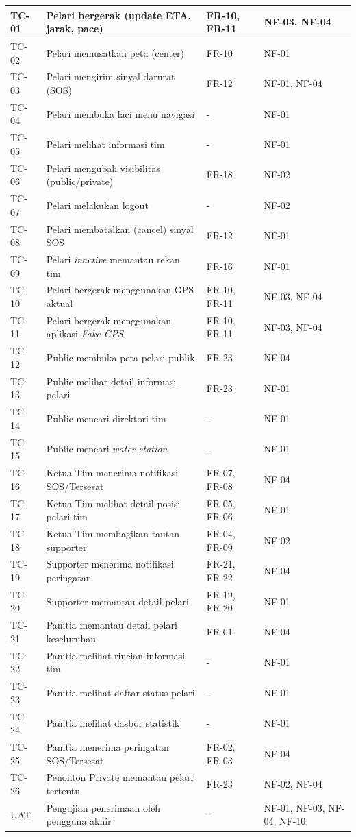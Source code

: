 \begin{longtable}{|p{1.5cm}|p{6cm}|p{2.5cm}|p{2.5cm}|}
TC-01 & Pelari bergerak (update ETA, jarak, pace) & FR-10, FR-11 & NF-03, NF-04 \\ \hline
TC-02 & Pelari memusatkan peta (center) & FR-10 & NF-01 \\ \hline
TC-03 & Pelari mengirim sinyal darurat (SOS) & FR-12 & NF-01, NF-04 \\ \hline
TC-04 & Pelari membuka laci menu navigasi & - & NF-01 \\ \hline
TC-05 & Pelari melihat informasi tim & - & NF-01 \\ \hline
TC-06 & Pelari mengubah visibilitas (public/private) & FR-18 & NF-02 \\ \hline
TC-07 & Pelari melakukan logout & - & NF-02 \\ \hline
TC-08 & Pelari membatalkan (cancel) sinyal SOS & FR-12 & NF-01 \\ \hline
TC-09 & Pelari \textit{inactive} memantau rekan tim & FR-16 & NF-01 \\ \hline
TC-10 & Pelari bergerak menggunakan GPS aktual & FR-10, FR-11 & NF-03, NF-04 \\ \hline
TC-11 & Pelari bergerak menggunakan aplikasi \textit{Fake GPS} & FR-10, FR-11 & NF-03, NF-04 \\ \hline
TC-12 & Public membuka peta pelari publik & FR-23 & NF-04 \\ \hline
TC-13 & Public melihat detail informasi pelari & FR-23 & NF-01 \\ \hline
TC-14 & Public mencari direktori tim & - & NF-01 \\ \hline
TC-15 & Public mencari \textit{water station} & - & NF-01 \\ \hline
TC-16 & Ketua Tim menerima notifikasi SOS/Tersesat & FR-07, FR-08 & NF-04 \\ \hline
TC-17 & Ketua Tim melihat detail posisi pelari tim & FR-05, FR-06 & NF-01 \\ \hline
TC-18 & Ketua Tim membagikan tautan supporter & FR-04, FR-09 & NF-02 \\ \hline
TC-19 & Supporter menerima notifikasi peringatan & FR-21, FR-22 & NF-04 \\ \hline
TC-20 & Supporter memantau detail pelari & FR-19, FR-20 & NF-01 \\ \hline
TC-21 & Panitia memantau detail pelari keseluruhan & FR-01 & NF-04 \\ \hline
TC-22 & Panitia melihat rincian informasi tim & - & NF-01 \\ \hline
TC-23 & Panitia melihat daftar status pelari & - & NF-01 \\ \hline
TC-24 & Panitia melihat dasbor statistik & - & NF-01 \\ \hline
TC-25 & Panitia menerima peringatan SOS/Tersesat & FR-02, FR-03 & NF-04 \\ \hline
TC-26 & Penonton Private memantau pelari tertentu & FR-23 & NF-02, NF-04 \\ \hline
UAT & Pengujian penerimaan oleh pengguna akhir & - & NF-01, NF-03, NF-04, NF-10 \\ \hline

\end{longtable}
